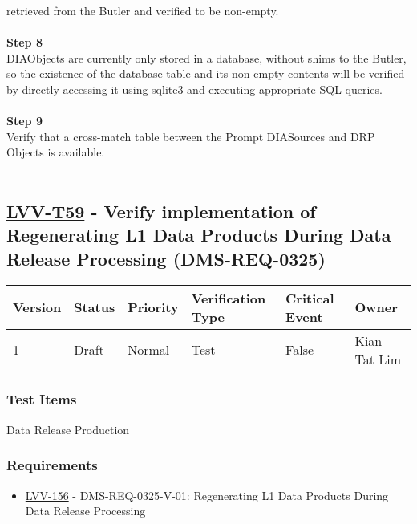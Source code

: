 retrieved from the Butler and verified to be non-empty.\\
~\\
\textbf{Step 8}\\
DIAObjects are currently only stored in a database, without shims to the
Butler, so the existence of the database table and its non-empty
contents will be verified by directly accessing it using sqlite3 and
executing appropriate SQL queries.\\
~\\
\textbf{Step 9}\\
Verify that a cross-match table between the Prompt DIASources and DRP
Objects is available.\\
~\\

\hypertarget{lvv-t59---verify-implementation-of-regenerating-l1-data-products-during-data-release-processing-dms-req-0325}{%
\subsection{\texorpdfstring{\href{https://jira.lsstcorp.org/secure/Tests.jspa\#/testCase/LVV-T59}{LVV-T59}
- Verify implementation of Regenerating L1 Data Products During Data
Release Processing
(DMS-REQ-0325)}{LVV-T59 - Verify implementation of Regenerating L1 Data Products During Data Release Processing (DMS-REQ-0325)}}\label{lvv-t59---verify-implementation-of-regenerating-l1-data-products-during-data-release-processing-dms-req-0325}}

\begin{longtable}[]{@{}llllll@{}}
\toprule
Version & Status & Priority & Verification Type & Critical Event &
Owner\tabularnewline
\midrule
\endhead
1 & Draft & Normal & Test & False & Kian-Tat Lim\tabularnewline
\bottomrule
\end{longtable}

\hypertarget{test-items-35}{%
\subsubsection{Test Items}\label{test-items-35}}

Data Release Production~

\hypertarget{requirements-36}{%
\subsubsection{Requirements}\label{requirements-36}}

\begin{itemize}
\tightlist
\item
  \href{https://jira.lsstcorp.org/browse/LVV-156}{LVV-156} -
  DMS-REQ-0325-V-01: Regenerating L1 Data Products During Data Release
  Processing
\end{itemize}

